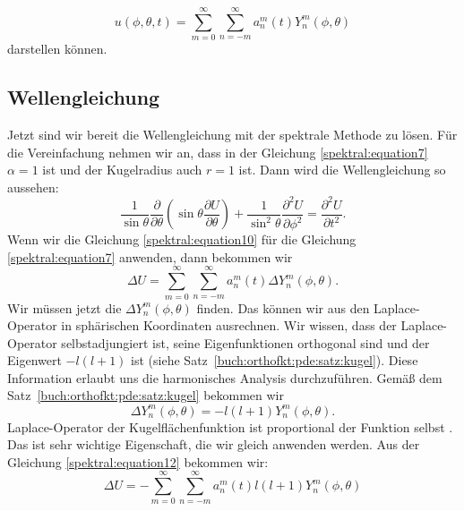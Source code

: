 \begin{equation}
u(\phi,\theta,t) = \sum_{m=0}^{\infty}\sum_{n=-m}^{\infty}a_n^m(t)Y_n^m(\phi, \theta)
\label{spektral:equation10}
\end{equation}
darstellen können.

\subsection{Wellengleichung
\label{spektral:subsection:wellengleichung}}
Jetzt sind wir bereit die Wellengleichung mit der spektrale Methode zu lösen.
Für die Vereinfachung nehmen wir an, dass in der Gleichung \eqref{spektral:equation7} $\alpha=1$ ist und der Kugelradius auch $r=1$ ist.
Dann wird die Wellengleichung so aussehen:
\begin{equation}
\frac{1}{\sin\theta}\frac{\partial}{\partial{\theta}}\left(\sin\theta\frac{\partial{U}}{\partial{\theta}}\right) + \frac{1}{\sin^2\theta}\frac{\partial^2{U}}{\partial{\phi^2}} = \frac{\partial^2{U}}{\partial{t^2}}.
\label{spektral:equation11}
\end{equation}
Wenn wir die Gleichung \eqref{spektral:equation10} für die Gleichung \eqref{spektral:equation7} anwenden, dann bekommen wir
\begin{equation}
\Delta{U} = \sum_{m=0}^{\infty}\sum_{n=-m}^{\infty}a_n^m(t)\Delta{Y_n^m(\phi, \theta)}.
\label{spektral:equation12}
\end{equation}
Wir müssen jetzt die $\Delta{Y_n^m(\phi, \theta)}$ finden.
Das können wir aus den Laplace-Operator in sphärischen Koordinaten ausrechnen. Wir wissen, dass der Laplace-Operator selbstadjungiert ist, seine Eigenfunktionen orthogonal sind und der Eigenwert $-l(l+1)$ ist (siehe Satz~\ref{buch:orthofkt:pde:satz:kugel}).
Diese Information erlaubt uns die harmonisches Analysis durchzuführen.
Gemäß dem Satz~\ref{buch:orthofkt:pde:satz:kugel} bekommen wir
\begin{equation}
\Delta{Y_n^m(\phi, \theta)} = -l(l+1)Y_n^m(\phi, \theta).
\label{spektral:equation16}
\end{equation}
Laplace-Operator der Kugelflächenfunktion ist proportional der Funktion selbst \cite[Seite 663]{spektral:DynamicOfTheAtmosphere}. Das ist sehr wichtige Eigenschaft, die wir gleich anwenden werden.
Aus der Gleichung \eqref{spektral:equation12} bekommen wir:
\begin{equation}
\Delta{U} = -\sum_{m=0}^{\infty}\sum_{n=-m}^{\infty}a_n^m(t)l(l+1)Y_n^m(\phi, \theta)
\label{spektral:equation17}
\end{equation}
